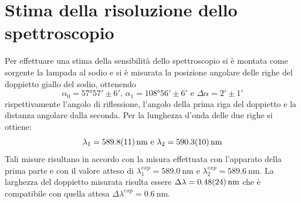 \section{Stima della risoluzione dello spettroscopio}
	Per effettuare una stima della sensibilità dello
	spettroscopio si è montata come sorgente la 
	lampada al sodio e si è misurata la posizione angolare delle righe del doppietto giallo
	del sodio, ottenendo $$\alpha_0= \ang{57;57;} \pm 6'
	\text{, }\alpha_1=	\ang{108;56;}\pm 6' \text{ e } \Delta\alpha=2' \pm 1'$$
rispettivamente l'angolo di riflessione, l'angolo della prima riga del doppietto e la distanza angolare dalla seconda.
Per la lunghezza d'onda delle due righe si ottiene:
	$$\lambda_1= \SI{589.8 \pm 1.1}{\nano\meter}\text{ e } \lambda_2=  \SI{590.3 \pm 1.0}{\nano\meter}$$
	Tali misure risultano in accordo con 
	la misura effettuata con l'apparato della prima parte e con il valore atteso di $\lambda_1^{exp}= \SI{589.0}{\nano\meter}\text{ e } \lambda_2^{exp}=  \SI{589.6}{\nm}$.
		La larghezza del doppietto misurata risulta essere $\Delta 	\lambda=\SI{0.48 \pm 0.24}{\nano\meter}$ che è compatibile con quella attesa $\Delta 	\lambda^{exp}=\SI{0.6}{\nano\meter}$.